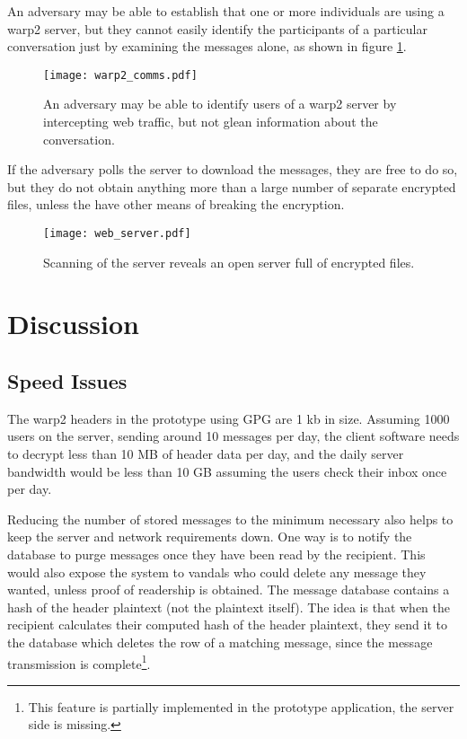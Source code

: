 \pdfoutput=1 \documentclass{article}
\begin{document}
An adversary may be able to establish that one or more individuals are using a warp2 server, but they cannot easily identify the participants of a particular conversation just by examining the messages alone, as shown in figure \ref{fig:comms}.
\begin{figure}
\centering
\texttt{[image: warp2\_comms.pdf]}
\caption{An adversary may be able to identify users of a warp2 server by intercepting web traffic, but not glean information about the conversation.}
\label{fig:comms}
\end{figure}

If the adversary polls the server to download the messages, they are free to do so, but they do not obtain anything more than a large number of separate encrypted files, unless the have other means of breaking the encryption.  
\begin{figure}
\centering
\texttt{[image: web\_server.pdf]}
\caption{Scanning of the server reveals an open server full of encrypted files.}
\label{fig:webserver}
\end{figure}






\section{Discussion}


\subsection{Speed Issues\label{sec:speed}}
The warp2 headers in the prototype using GPG are 1 kb in size.  Assuming 1000 users on the server, sending around 10 messages per day, the client software needs to decrypt less than 10 MB of header data per day, and the daily server bandwidth would be less than 10 GB assuming the users check their inbox once per day.

Reducing the number of stored messages to the minimum necessary also helps to keep the server and network requirements down.  One way is to notify the database to purge messages once they have been read by the recipient.  This would also expose the system to vandals who could delete any message they wanted, unless proof of readership is obtained.  The message database contains a hash of the header plaintext (not the plaintext itself).  The idea is that when the recipient calculates their computed hash of the header plaintext, they send it to the database which deletes the row of a matching message, since the message transmission is complete\footnote{This feature is partially implemented in the prototype application, the server side is missing.}.
\end{document}

